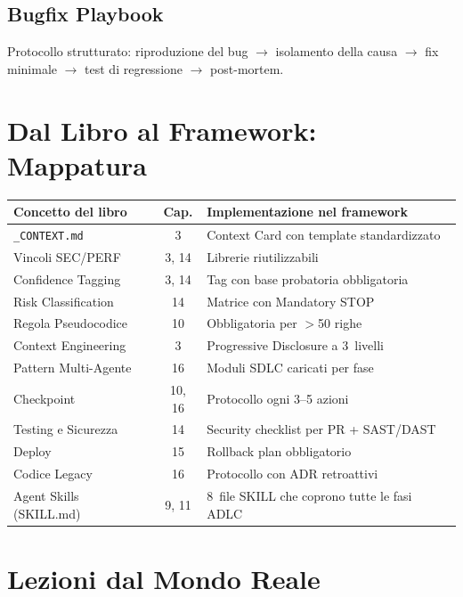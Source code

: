 \subsection{Bugfix Playbook}

Protocollo strutturato: riproduzione del bug $\rightarrow$ isolamento della causa $\rightarrow$ fix minimale $\rightarrow$ test di regressione $\rightarrow$ post-mortem.

\section{Dal Libro al Framework: Mappatura}

\begin{center}
\begin{small}
\begin{tabularx}{\textwidth}{l c X}
\toprule
\textbf{Concetto del libro} & \textbf{Cap.} & \textbf{Implementazione nel framework} \\
\midrule
\texttt{\_CONTEXT.md} & 3 & Context Card con template standardizzato \\
Vincoli SEC/PERF & 3, 14 & Librerie riutilizzabili \\
Confidence Tagging & 3, 14 & Tag con base probatoria obbligatoria \\
Risk Classification & 14 & Matrice con Mandatory STOP \\
Regola Pseudocodice & 10 & Obbligatoria per $>$50 righe \\
Context Engineering & 3 & Progressive Disclosure a 3~livelli \\
Pattern Multi-Agente & 16 & Moduli SDLC caricati per fase \\
Checkpoint & 10, 16 & Protocollo ogni 3--5 azioni \\
Testing e Sicurezza & 14 & Security checklist per PR + SAST/DAST \\
Deploy & 15 & Rollback plan obbligatorio \\
Codice Legacy & 16 & Protocollo con ADR retroattivi \\
Agent Skills (SKILL.md) & 9, 11 & 8~file SKILL che coprono tutte le fasi ADLC \\
\bottomrule
\end{tabularx}
\end{small}
\end{center}

\section{Lezioni dal Mondo Reale}

